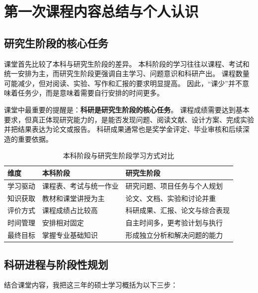 \documentclass[UTF8,zihao=-4,a4paper,fontset=windows]{ctexart}
\begin{document}
\begin{multicols}{2}
\small
\tableofcontents
\end{multicols}
\clearpage
{}

\section{第一次课程内容总结与个人认识}

\subsection{研究生阶段的核心任务}

课堂首先比较了本科与研究生阶段的差异。
本科阶段的学习往往以课程、考试和统一安排为主，而研究生阶段更强调自主学习、问题意识和科研产出。
课程数量可能减少，但对阅读、实验、写作和汇报的要求明显提高。
因此，“课少”并不意味着任务少，而是意味着需要自行安排的时间更多。

课堂中最重要的提醒是：\textbf{科研是研究生阶段的核心任务}。
课程成绩需要达到基本要求，但真正体现研究能力的，是能否发现问题、阅读文献、设计方案、完成实验并把结果表达为论文或报告。
科研成果通常也是奖学金评定、毕业审核和后续深造的重要依据。
\begin{table}[htbp]
\centering
\caption{本科阶段与研究生阶段学习方式对比}
\begin{tabularx}{\textwidth}{C{2.4cm}YY}
\toprule
\textbf{维度} & \textbf{本科阶段} & \textbf{研究生阶段} \\
\midrule
学习驱动 & 课程表、考试与统一作业 & 研究问题、项目任务与个人规划 \\
知识获取 & 教材和课堂讲授为主 & 论文、文档、实验和讨论并重 \\
评价方式 & 课程成绩占比较高 & 科研成果、汇报、论文与综合表现 \\
时间管理 & 安排相对固定 & 自主时间多，更考验计划与执行 \\
最终目标 & 掌握专业基础知识 & 形成独立分析和解决问题的能力 \\
\bottomrule
\end{tabularx}
\end{table}

\subsection{科研进程与阶段性规划}

结合课堂内容，我把这三年的硕士学习概括为以下三步：
\end{document}
